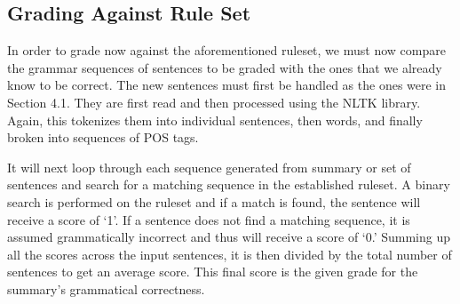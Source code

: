 \documentclass[11pt,a4paper]{article}
\begin{document}
\begin{multicols}{2}
\subsection{Grading Against Rule Set}
In order to grade now against the aforementioned ruleset, we must now compare the grammar sequences of sentences to be graded with the ones that we already know to be correct. The new sentences must first be handled as the ones were in Section 4.1. They are first read and then processed using the NLTK library. Again, this tokenizes them into individual sentences, then words, and finally broken into sequences of POS tags.

It will next loop through each sequence generated from summary or set of sentences and search for a matching sequence in the established ruleset. A binary search is performed on the ruleset and if a match is found, the sentence will receive a score of `1'. If a sentence does not find a matching sequence, it is assumed grammatically incorrect and thus will receive a score of `0.' Summing up all the scores across the input sentences, it is then divided by the total number of sentences to get an average score. This final score is the given grade for the summary's grammatical correctness.


\end{multicols}
\end{document}
